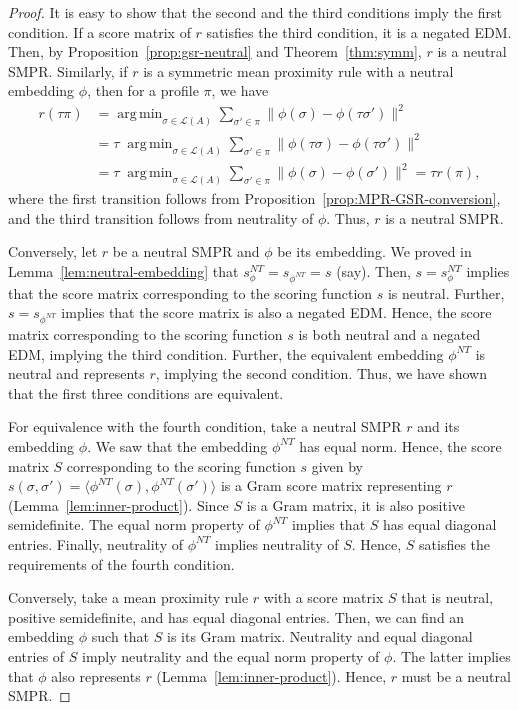 \documentclass[prodmode]{acmsmall-ec14}
\newcommand{\calL}{{\mathcal{L}}}
\newcommand{\rank}{{\calL(A)}}
\DeclareMathOperator*{\argmin}{arg\,min}
\newcommand{\nt}{NT}
\begin{document}
\begin{proof}
It is easy to show that the second and the third conditions imply the first condition. If a score matrix of $r$ satisfies the third condition, it is a negated EDM. Then, by Proposition~\ref{prop:gsr-neutral} and Theorem~\ref{thm:symm}, $r$ is a neutral SMPR. Similarly, if $r$ is a symmetric mean proximity rule with a neutral embedding $\phi$, then for a profile $\pi$, we have 
\begin{align*}
r(\tau \pi) &= \argmin_{\sigma \in \rank} \sum_{\sigma' \in \pi} \|\phi(\sigma)-\phi(\tau \sigma')\|^2 \\
&= \tau \; \argmin_{\sigma \in \rank} \sum_{\sigma' \in \pi} \|\phi(\tau \sigma)-\phi(\tau \sigma')\|^2 \\
&= \tau \; \argmin_{\sigma \in \rank} \sum_{\sigma' \in \pi} \|\phi(\sigma)-\phi(\sigma')\|^2 = \tau r(\pi),
\end{align*}
where the first transition follows from Proposition~\ref{prop:MPR-GSR-conversion}, and the third transition follows from neutrality of $\phi$. Thus, $r$ is a neutral SMPR. 

Conversely, let $r$ be a neutral SMPR and $\phi$ be its embedding. We proved in Lemma~\ref{lem:neutral-embedding} that $s_{\phi}^{\nt} = s_{\phi^{\nt}} = s$ (say). Then, $s = s_{\phi}^{\nt}$ implies that the score matrix corresponding to the scoring function $s$ is neutral. Further, $s = s_{\phi^{\nt}}$ implies that the score matrix is also a negated EDM. Hence, the score matrix corresponding to the scoring function $s$ is both neutral and a negated EDM, implying the third condition. Further, the equivalent embedding $\phi^{\nt}$ is neutral and represents $r$, implying the second condition. Thus, we have shown that the first three conditions are equivalent. 

For equivalence with the fourth condition, take a neutral SMPR $r$ and its embedding $\phi$. We saw that the embedding $\phi^{\nt}$ has equal norm. Hence, the score matrix $S$ corresponding to the scoring function $s$ given by $s(\sigma,\sigma') = \langle \phi^{\nt}(\sigma),\phi^{\nt}(\sigma')\rangle$ is a Gram score matrix representing $r$ (Lemma~\ref{lem:inner-product}). Since $S$ is a Gram matrix, it is also positive semidefinite. The equal norm property of $\phi^{\nt}$ implies that $S$ has equal diagonal entries. Finally, neutrality of $\phi^{\nt}$ implies neutrality of $S$. Hence, $S$ satisfies the requirements of the fourth condition. 

Conversely, take a mean proximity rule $r$ with a score matrix $S$ that is neutral, positive semidefinite, and has equal diagonal entries. Then, we can find an embedding $\phi$ such that $S$ is its Gram matrix. Neutrality and equal diagonal entries of $S$ imply neutrality and the equal norm property of $\phi$. The latter implies that $\phi$ also represents $r$ (Lemma~\ref{lem:inner-product}). Hence, $r$ must be a neutral SMPR. 
\end{proof}
\end{document}
